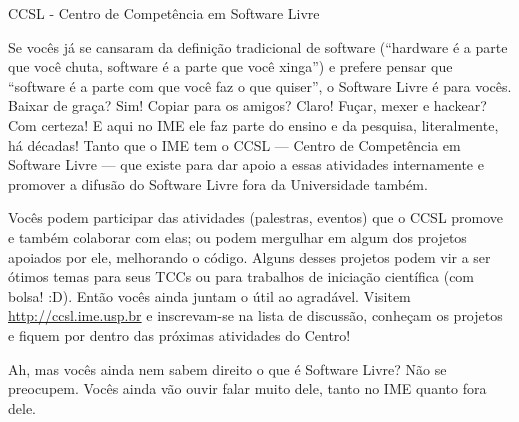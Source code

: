 \begin{secao}{CCSL - Centro de Competência em Software Livre}

Se vocês já se cansaram da definição tradicional de software (``hardware é a
parte que você chuta, software é a parte que você xinga'') e prefere pensar que
``software é a parte com que você faz o que quiser'', o Software Livre é para
vocês. Baixar de graça? Sim! Copiar para os amigos? Claro! Fuçar, mexer e
hackear? Com certeza! E aqui no IME ele faz parte do ensino e da pesquisa,
literalmente, há décadas! Tanto que o IME tem o CCSL — Centro de Competência em
Software Livre — que existe para dar apoio a essas atividades internamente e
promover a difusão do Software Livre fora da Universidade também.

Vocês podem participar das atividades (palestras, eventos) que o CCSL
promove e também colaborar com elas; ou podem mergulhar em algum dos
projetos apoiados por ele, melhorando o código. Alguns desses projetos
podem vir a ser ótimos temas para seus TCCs ou para trabalhos de
iniciação científica (com bolsa! :D). Então vocês ainda juntam o útil ao
agradável. Visitem \url{http://ccsl.ime.usp.br} e inscrevam-se na lista de discussão,
conheçam os projetos e fiquem por dentro das próximas atividades do
Centro! 

Ah, mas vocês ainda nem sabem direito o que é Software Livre? Não se preocupem.
Vocês ainda vão ouvir falar muito dele, tanto no IME quanto fora dele.

\end{secao}
